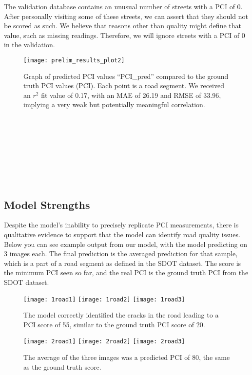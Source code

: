 \documentclass{article}
\begin{document}
The validation database contains an unusual number of streets with a PCI of 0. After personally visiting some of these streets, we can assert that they should not be scored as such. We believe that reasons other than quality might define that value, such as missing readings. Therefore, we will ignore streets with a PCI of 0 in the validation.

\begin{figure}[ht]
\centering
    \texttt{[image: prelim\_results\_plot2]}
    \caption{\centering Graph of predicted PCI values “PCI\_pred” compared to the ground truth PCI values (PCI). Each point is a road segment. We received an ${r}^2$ fit value of 0.17, with an MAE of 26.19 and RMSE of 33.96, implying a very weak but potentially meaningful correlation.}
    \label{fig:verticalcell}
\end{figure}

~\\~\\~\\~\\~\\~\\~\\

\subsection{Model Strengths}

Despite the model’s inability to precisely replicate PCI measurements, there is qualitative evidence to support that the model can identify road quality issues. Below you can see example output from our model, with the model predicting on 3 images each. The final prediction is the averaged prediction for that sample, which is a part of a road segment as defined in the SDOT dataset. The score is the minimum PCI seen so far, and the real PCI is the ground truth PCI from the SDOT dataset.

\begin{figure}[ht]
\centering
    {{\texttt{[image: 1road1]} }}%
    {{\texttt{[image: 1road2]} }}%
    {{\texttt{[image: 1road3]} }}%
    \caption{\centering The model correctly identified the cracks in the road leading to a PCI score of 55, similar to the ground truth PCI score of 20.}%
    \label{fig:example}%
\end{figure}
\begin{figure}[ht]
\centering
    {{\texttt{[image: 2road1]} }}%
    {{\texttt{[image: 2road2]} }}%
    {{\texttt{[image: 2road3]} }}%
    \caption{\centering The average of the three images was a predicted PCI of 80, the same as the ground truth score. }%
    \label{fig:example}%
\end{figure}
\end{document}
